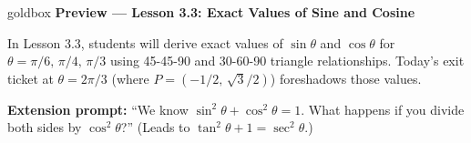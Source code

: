 \documentclass[10pt]{article}
\begin{document}
\vspace{6pt}

\begin{skillbox}{goldbox}
  \textbf{Preview --- Lesson 3.3: Exact Values of Sine and Cosine}

  In Lesson 3.3, students will derive exact values of $\sin\theta$ and $\cos\theta$ for
  $\theta = \pi/6,\, \pi/4,\, \pi/3$ using 45-45-90 and 30-60-90 triangle relationships.
  Today's exit ticket at $\theta = 2\pi/3$ (where $P = (-1/2,\,\sqrt{3}/2)$) foreshadows
  those values.

  \medskip
  \textbf{Extension prompt:} ``We know $\sin^2\theta + \cos^2\theta = 1$. What happens if you
  divide both sides by $\cos^2\theta$?'' (Leads to $\tan^2\theta + 1 = \sec^2\theta$.)
\end{skillbox}
\end{document}
